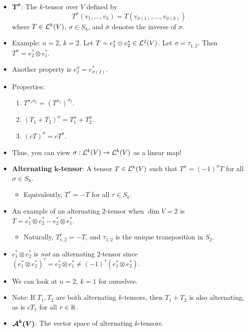 \documentclass[../notes.tex]{subfiles}
\begin{document}
\begin{itemize}
    \item $\bm{T^\sigma}$: The $k$-tensor over $V$ defined by
    \begin{equation*}
        T^\sigma(v_1,\dots,v_k) = T(v_{\bar{\sigma}(1)},\dots,v_{\bar{\sigma}(k)})
    \end{equation*}
    where $T\in\lin[k]{V}$, $\sigma\in S_k$, and $\bar{\sigma}$ denotes the inverse of $\sigma$.
    \item Example: $n=2$, $k=2$. Let $T=e_1^*\otimes e_2^*\in\lin[2]{V}$. Let $\sigma=\tau_{1,2}$. Then $T^\sigma=e_2^*\otimes e_1^*$.
    \item Another property is $e_I^\sigma=e_{\sigma(I)}^*$.
    \item Properties:
    \begin{enumerate}
        \item $T^{\sigma_1\sigma_2}=(T^{\sigma_1})^{\sigma_2}$.
        \item $(T_1+T_2)^\sigma=T_1^\sigma+T_2^\sigma$.
        \item $(cT)^\sigma=cT^\sigma$.
    \end{enumerate}
    \item Thus, you can view $\sigma:\lin[k]{V}\to\lin[k]{V}$ as a linear map!
    \item \textbf{Alternating $\bm{k}$-tensor}: A tensor $T\in\lin[k]{V}$ such that $T^\sigma=(-1)^\sigma T$ for all $\sigma\in S_k$.
    \begin{itemize}
        \item Equivalently, $T^\tau=-T$ for all $\tau\in S_k$.
    \end{itemize}
    \item An example of an alternating $2$-tensor when $\dim V=2$ is $T=e_1^*\otimes e_2^*-e_2^*\otimes e_1^*$.
    \begin{itemize}
        \item Naturally, $T^\tau_{1,2}=-T$, and $\tau_{1,2}$ is the unique transposition in $S_2$.
    \end{itemize}
    \item $e_1^*\otimes e_2^*$ is \emph{not} an alternating 2-tensor since $(e_1^*\otimes e_2^*)^\tau=e_2^*\otimes e_1^*\neq(-1)^\tau(e_1^*\otimes e_2^*)$.
    \item We can look at $n=2$, $k=1$ for ourselves.
    \item Note: If $T_1,T_2$ are both alternating $k$-tensors, then $T_1+T_2$ is also alternating, as is $cT_1$ for all $c\in\R$.
    \item $\bm{\alt[k]{V}}$: The vector space of alternating $k$-tensors.

\end{itemize}
\end{document}
